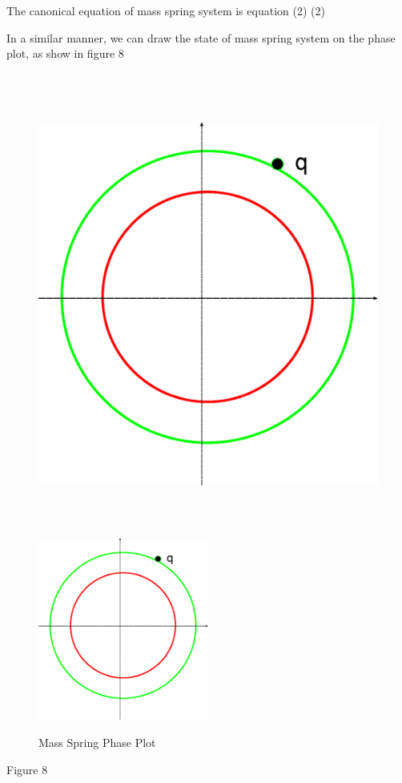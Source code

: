 The canonical equation of mass spring system is equation (2)
(2)

In a similar manner, we can draw the state of mass spring system on the phase plot, as show in figure 8


\begin{figure}[!htbp]
  \begin{center}
    \leavevmode
    \ifpdf
      \includegraphics[height=6in]{MassSpringPhasePlot}
    \else
      \includegraphics[width=0.5\textwidth]{MassSpringPhasePlot}
    \fi
    \caption{Mass Spring Phase Plot}
    \label{fig:massSpringPhasePlot}
  \end{center}
\end{figure}
Figure 8

